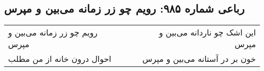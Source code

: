 \begin{center}
\section*{رباعی شماره ۹۸۵: رویم چو زر زمانه می‌بین و مپرس}
\label{sec:0985}
\begin{longtable}{l p{0.5cm} r}
رویم چو زر زمانه می‌بین و مپرس
&&
این اشک چو ناردانه می‌بین و مپرس
\\
احوال درون خانه از من مطلب
&&
خون بر در آستانه می‌بین و مپرس
\\
\end{longtable}
\end{center}
